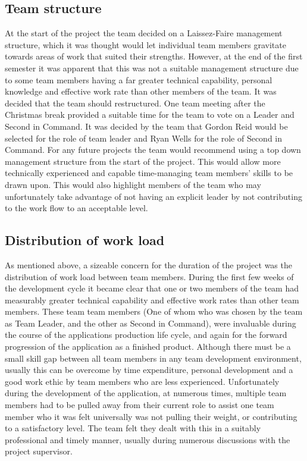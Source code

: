 \subsection{Team structure}

At the start of the project the team decided on a Laissez-Faire management
structure, which it was thought would let individual team members gravitate
towards areas of work that suited their strengths. However, at the end of the
first semester it was apparent that this was not a suitable management
structure due to some team members having a far greater technical capability,
personal knowledge and effective work rate than other members of the team. It
was decided that the team should restructured. One team meeting after the
Christmas break provided a suitable time for the team to vote on a Leader and
Second in Command. It was decided by the team that Gordon Reid would be
selected for the role of team leader and Ryan Wells for the role of Second in
Command. For any future projects the team would recommend using a top down
management structure from the start of the project. This would allow more
technically experienced and capable time-managing team members' skills to be
drawn upon. This would also highlight members of the team who may  unfortunately
take advantage of not having an explicit leader by not  contributing to the work
flow to an acceptable level.

\subsection{Distribution of work load}

As mentioned above, a sizeable concern for the duration of the project was the
distribution of work load between team members. During the first few weeks of
the development cycle it became clear that one or two members of the team had
measurably greater technical capability and effective work rates than other
team members. These team team members (One of whom who was chosen by the team
as Team Leader, and the other as Second in Command), were invaluable during  the
course of the applications production life cycle, and again for the  forward
progression of the application as a finished product. Although there  must be a
small skill gap between all team members in any team development  environment,
usually this can be overcome by time expenditure, personal  development and a
good work ethic by team members who are less experienced.  Unfortunately during
the development of the application, at numerous times,  multiple team members
had to be pulled away from their current role to assist  one team member who it
was felt universally was not pulling their weight, or  contributing to a
satisfactory level. The team felt they dealt with this in a  suitably
professional and timely manner, usually during numerous discussions  with the
project supervisor.

